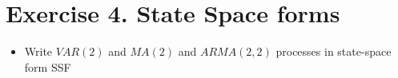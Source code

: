 \documentclass[11pt]{article}
\begin{document}

\newpage
\section{Exercise 4. State Space forms}



\begin{itemize}
    \item Write $VAR(2)$ and $MA(2)$ and $ARMA(2,2)$ processes in state-space form SSF
\end{itemize}
    


\end{document}
